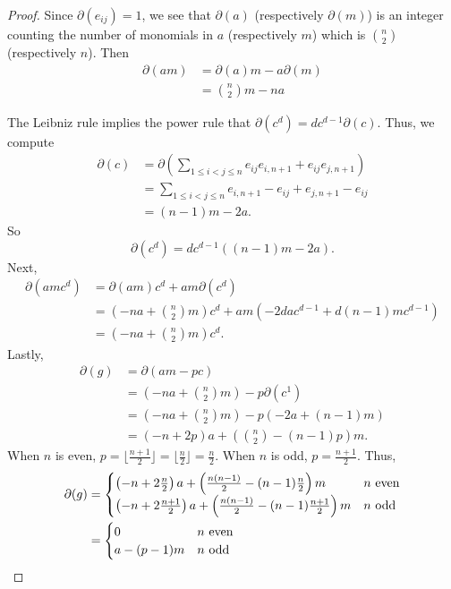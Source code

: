 \documentclass[10pt,a4paper]{amsart}
\begin{document}
\begin{proof}
    Since $\partial(e_{ij})=1$, we see that $\partial(a)$ (respectively $\partial(m)$) is an integer counting the number of monomials in $a$ (respectively $m$) which is $\binom{n}{2}$ (respectively $n$).
    Then
    \begin{align*}
        \partial(am)
        &= \partial(a)m - a \partial(m)\\
        &= \binom{n}{2}m - na
    \end{align*}

    The Leibniz rule implies the power rule that $\partial(c^d) = dc^{d-1}\partial(c)$.
    Thus, we compute
    \begin{align*}
        \partial(c) &= \partial\left( \sum_{1 \leq i < j \leq n} e_{ij}e_{i,n+1} + e_{ij}e_{j,n+1}\right) \\
        &=\sum_{1 \leq i < j \leq n} e_{i,n+1} - e_{ij} + e_{j,n+1} - e_{ij}\\
        &=(n-1) m - 2a.
    \end{align*}
    So
    \[\partial(c^d) = dc^{d-1}\left((n-1)m - 2a\right).\]
    Next,
    \begin{align*}
        \partial(amc^d)
        &= \partial(am)c^d + am \partial(c^d)\\
        &= \left( -na + \binom{n}{2}m \right) c^d + am \left(-2dac^{d-1} + d(n-1)mc^{d-1}\right)\\
        &= \left( -na + \binom{n}{2} m \right) c^d.
    \end{align*}
    Lastly,
    \begin{align*}
        \partial(g)
        &= \partial(am - pc)\\
        &= (-na + \binom{n}{2}m) - p \partial(c^1)\\
        &= (-na + \binom{n}{2}m) - p \left(-2a + (n-1)m \right)\\
        &= \left(-n +2p\right) a + \left(\binom{n}{2} -(n-1)p\right) m.
    \end{align*}
    When $n$ is even, $p = \lfloor\frac{n+1}{2} \rfloor = \lfloor\frac{n}{2}\rfloor = \frac{n}{2}$.
    When $n$ is odd, $p = \frac{n+1}{2}$.
    Thus,
    \begin{align*}
        \partial(g)
        &=
        \begin{cases}
           \left (-n+ 2 \frac{n}{2} \right)a + \left( \frac{n(n-1)}{2} - (n-1)\frac{n}{2}\right)m & n~\text{even}\\
           \left (-n+ 2 \frac{n+1}{2} \right)a + \left( \frac{n(n-1)}{2} - (n-1)\frac{n+1}{2}\right)m  & n~\text{odd}
        \end{cases}\\
        &=
        \begin{cases}
            0 & n~\text{even}\\
            a - (p-1)m& n~\text{odd}
        \end{cases}
        \qedhere
    \end{align*}
\end{proof}
\end{document}
